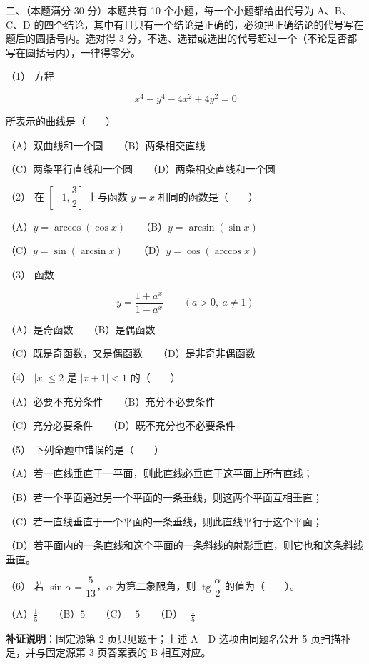 \begin{question}

二、（本题满分 30 分）本题共有 10 个小题，每一个小题都给出代号为 A、B、C、D 的四个结论，其中有且只有一个结论是正确的，必须把正确结论的代号写在题后的圆括号内。选对得 3 分，不选、选错或选出的代号超过一个（不论是否都写在圆括号内），一律得零分。

（1） 方程

\nopagebreak[4]
\[
x^4-y^4-4x^2+4y^2=0
\]

所表示的曲线是\mbox{（　　）}

（A）双曲线和一个圆　　（B）两条相交直线

（C）两条平行直线和一个圆　　（D）两条相交直线和一个圆

（2） 在 $\left[-1,\dfrac32\right]$ 上与函数 $y=x$ 相同的函数是\mbox{（　　）}

（A）$y=\arccos(\cos x)$　　（B）$y=\arcsin(\sin x)$

（C）$y=\sin(\arcsin x)$　　（D）$y=\cos(\arccos x)$

（3） 函数

\nopagebreak[4]
\[
y=\frac{1+a^x}{1-a^x}\qquad(a>0,\ a\ne1)
\]

（A）是奇函数　　（B）是偶函数

（C）既是奇函数，又是偶函数　　（D）是非奇非偶函数

（4） $|x|\le2$ 是 $|x+1|<1$ 的\mbox{（　　）}

（A）必要不充分条件　　（B）充分不必要条件

（C）充分必要条件　　（D）既不充分也不必要条件

（5） 下列命题中错误的是\mbox{（　　）}

（A）若一直线垂直于一平面，则此直线必垂直于这平面上所有直线；

（B）若一个平面通过另一个平面的一条垂线，则这两个平面互相垂直；

（C）若一直线垂直于一个平面的一条垂线，则此直线平行于这个平面；

（D）若平面内的一条直线和这个平面的一条斜线的射影垂直，则它也和这条斜线垂直。

（6） 若 $\sin\alpha=\dfrac5{13}$，$\alpha$ 为第二象限角，则 $\operatorname{tg}\dfrac\alpha2$ 的值为\mbox{（　　）}。

（A）$\frac15$　　（B）$5$　　（C）$-5$　　（D）$-\frac15$

\begin{gktip}
\textbf{补证说明}：固定源第 2 页只见题干；上述 A—D 选项由同题名公开 5 页扫描补足，并与固定源第 3 页答案表的 B 相互对应。
\end{gktip}


\end{question}
